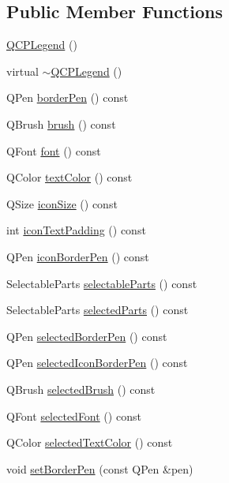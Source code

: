 \subsection*{Public Member Functions}
\begin{DoxyCompactItemize}
\item 
\hyperlink{classQCPLegend_a0001a456989bd07ea378883651fabd72}{Q\+C\+P\+Legend} ()
\item 
virtual \hyperlink{classQCPLegend_a52b305572e20f4e7cb37e945e2b9bec0}{$\sim$\+Q\+C\+P\+Legend} ()
\item 
Q\+Pen \hyperlink{classQCPLegend_a8ffd92df86ddf43696d95f04a20e3226}{border\+Pen} () const 
\item 
Q\+Brush \hyperlink{classQCPLegend_a7e5d2766e7d724f399022be8a4e8a2cb}{brush} () const 
\item 
Q\+Font \hyperlink{classQCPLegend_a5cf8b840bc02f7bf4edb8dde400d0f41}{font} () const 
\item 
Q\+Color \hyperlink{classQCPLegend_ad60a058af7491f6b140c104c6a0f9458}{text\+Color} () const 
\item 
Q\+Size \hyperlink{classQCPLegend_a27dfb770b14adc0e8811bef8129780a5}{icon\+Size} () const 
\item 
int \hyperlink{classQCPLegend_a9d6d07042a284c4ba5f9e3cb5c9281ef}{icon\+Text\+Padding} () const 
\item 
Q\+Pen \hyperlink{classQCPLegend_a2c4719d79630b0d0c75ef2333c59a912}{icon\+Border\+Pen} () const 
\item 
Selectable\+Parts \hyperlink{classQCPLegend_aa90c7fdbad7a0e93527bafb1f1f49a43}{selectable\+Parts} () const 
\item 
Selectable\+Parts \hyperlink{classQCPLegend_abbbf1b2d6a149013527ed87b0780894a}{selected\+Parts} () const 
\item 
Q\+Pen \hyperlink{classQCPLegend_a63156bc4ce64431bada7415cfa2b4dd1}{selected\+Border\+Pen} () const 
\item 
Q\+Pen \hyperlink{classQCPLegend_a165630cad7e41f89b54f65cdef3310e8}{selected\+Icon\+Border\+Pen} () const 
\item 
Q\+Brush \hyperlink{classQCPLegend_a600dde0d207ddc6f5a603767360cceac}{selected\+Brush} () const 
\item 
Q\+Font \hyperlink{classQCPLegend_a4c1b08fc0afacb4ffd54f6a49737fa77}{selected\+Font} () const 
\item 
Q\+Color \hyperlink{classQCPLegend_a08005f3c17728c2c4e23b8ffc0842ffb}{selected\+Text\+Color} () const 
\item 
void \hyperlink{classQCPLegend_a866a9e3f5267de7430a6c7f26a61db9f}{set\+Border\+Pen} (const Q\+Pen \&pen)

\end{DoxyCompactItemize}
